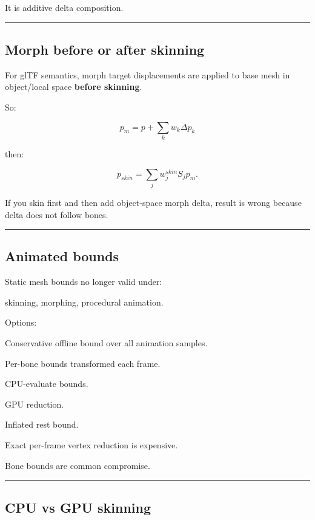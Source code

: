 It is additive delta composition.

\begin{center}\rule{0.5\linewidth}{0.5pt}\end{center}

\subsection{Morph before or after skinning}\label{04-visual-computing-ii-ch041-morph-before-or-after-skinning}

For glTF semantics, morph target displacements are applied to base mesh in object/local space \textbf{before skinning}.

So:

\[
\boxed{
p_m=
p+
\sum_kw_k\Delta p_k
}
\]

then:

\[
\boxed{
p_{skin}
=
\sum_j
w_j^{skin}
S_j
p_m.
}
\]

If you skin first and then add object-space morph delta, result is wrong because delta does not follow bones.

\begin{center}\rule{0.5\linewidth}{0.5pt}\end{center}

\subsection{Animated bounds}\label{04-visual-computing-ii-ch041-animated-bounds}

Static mesh bounds no longer valid under:

skinning, morphing, procedural animation.

Options:

Conservative offline bound over all animation samples.

Per-bone bounds transformed each frame.

CPU-evaluate bounds.

GPU reduction.

Inflated rest bound.

Exact per-frame vertex reduction is expensive.

Bone bounds are common compromise.

\begin{center}\rule{0.5\linewidth}{0.5pt}\end{center}

\subsection{CPU vs GPU skinning}\label{04-visual-computing-ii-ch041-cpu-vs-gpu-skinning}

